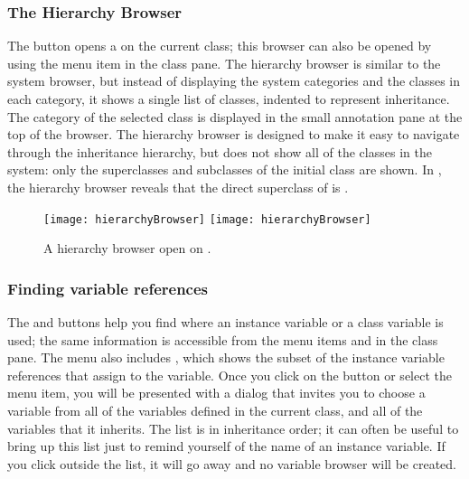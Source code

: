 \documentclass[a4paper,10pt,twoside]{book}
\begin{document}
\subsubsection{The Hierarchy Browser}
\label{sec:hierarchy}

The  button opens a  on the current class; this
browser can also be opened by using the  menu item in the class pane.
The hierarchy browser is similar to the system browser, but instead of displaying the system categories and the classes in each category, it shows a single list of classes, indented to represent inheritance.
The category of the selected class is displayed in the small annotation pane at the top of the browser.
The hierarchy browser is designed to make it easy to navigate through the inheritance hierarchy, but does not show all of the classes in the system: only the superclasses and subclasses of the initial class are shown.
In , the hierarchy browser reveals that the direct superclass of  is .

\begin{figure}[btp]
	\begin{center}
	\ifluluelse
		{\texttt{[image: hierarchyBrowser]}}
		{\texttt{[image: hierarchyBrowser]}}
	\end{center}
	\caption{A hierarchy browser open on .}
	\label{fig:hierarchyBrowser}
\end{figure}

\subsubsection{Finding variable references}
\label{sec:variables}

The  and  buttons help you find where an instance variable or a class variable is used; the same information is accessible from the  menu items  and  in the class pane.  
The menu also includes , which shows the subset of the instance variable references that assign to the variable. 
Once you click on the button or select the menu item, you will be presented with a dialog that invites you to choose a variable from all of the variables defined in the current class, and all of the variables that it inherits.  The list is in inheritance order; it can often be useful to bring up this list just to remind yourself of the name of an instance variable.  If you click outside the list, it will go away and no variable browser will be created.
\end{document}
